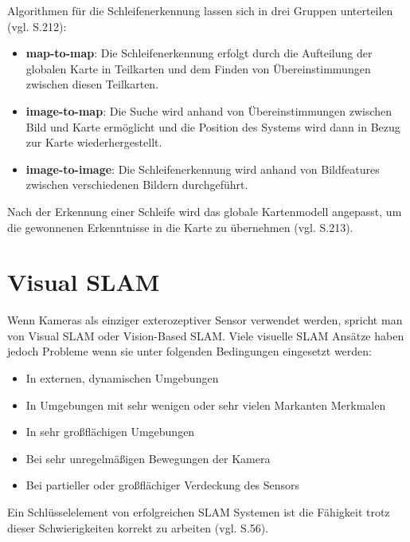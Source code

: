 Algorithmen für die Schleifenerkennung lassen sich in drei Gruppen unterteilen (vgl. \cite{loop_closure} S.212):

\begin{itemize}
\item \textbf{map-to-map}: Die Schleifenerkennung erfolgt durch die Aufteilung der globalen Karte in Teilkarten und dem Finden von Übereinstimmungen zwischen diesen Teilkarten.

\item \textbf{image-to-map}: Die Suche wird anhand von Übereinstimmungen zwischen Bild und Karte ermöglicht und die Position des Systems wird dann in Bezug zur Karte wiederhergestellt.

\item \textbf{image-to-image}: Die Schleifenerkennung wird anhand von Bildfeatures zwischen verschiedenen Bildern durchgeführt.

\end{itemize}
Nach der Erkennung einer Schleife wird das globale Kartenmodell angepasst, um die gewonnenen Erkenntnisse in die Karte zu übernehmen (vgl. \cite{loop_closure} S.213).

\section{Visual SLAM}

Wenn Kameras als einziger exterozeptiver Sensor verwendet werden, spricht man von \glqq Visual SLAM\grqq{} oder \glqq Vision-Based SLAM\grqq{}. Viele visuelle SLAM Ansätze haben jedoch Probleme wenn sie unter folgenden Bedingungen eingesetzt werden:

\begin{itemize}
\item In externen, dynamischen Umgebungen
\item In Umgebungen mit sehr wenigen oder sehr vielen Markanten Merkmalen
\item In sehr großflächigen Umgebungen
\item Bei sehr unregelmäßigen Bewegungen der Kamera
\item Bei partieller oder großflächiger Verdeckung des Sensors
\end{itemize}

Ein Schlüsselelement von erfolgreichen SLAM Systemen ist die Fähigkeit trotz dieser Schwierigkeiten korrekt zu arbeiten (vgl. \cite{survey} S.56).

